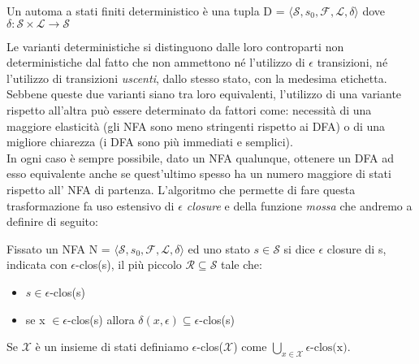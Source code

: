 \begin{definition}
    Un automa a stati finiti deterministico è una tupla D = $\langle \mathcal{S}, s_0, \mathcal{F}, \mathcal{L}, \delta \rangle$ dove $\delta : \mathcal{S} \times \mathcal{L} \rightarrow \mathcal{S}$
\end{definition}
Le varianti deterministiche si distinguono dalle loro controparti non deterministiche dal fatto che non ammettono né l'utilizzo di $\epsilon$ transizioni, né l'utilizzo di transizioni \emph{uscenti}, dallo stesso stato, con la medesima etichetta. Sebbene queste due varianti siano tra loro equivalenti, l'utilizzo di una variante rispetto all'altra può essere determinato da fattori come: necessità di una maggiore elasticità (gli NFA sono meno stringenti rispetto ai DFA) o di una migliore chiarezza (i DFA sono più immediati e semplici).\\
In ogni caso è sempre possibile, dato un NFA qualunque, ottenere un DFA ad esso equivalente anche se quest'ultimo spesso ha un numero maggiore di stati rispetto all' NFA di partenza. L'algoritmo che permette di fare questa trasformazione fa uso estensivo di \emph{$\epsilon$ closure}\cite{Linguaggi_di_Prorgammazione} e della funzione \emph{mossa}\cite{Linguaggi_di_Prorgammazione} che andremo a definire di seguito:

\begin{definition}
    Fissato un NFA N = $\langle \mathcal{S}, s_0, \mathcal{F}, \mathcal{L}, \delta \rangle$ ed uno stato $s \in \mathcal{S}$ si dice $\epsilon$ closure di s, indicata con $\epsilon$-clos(s), il più piccolo $\mathcal{R} \subseteq \mathcal{S}$ tale che:
    \begin{itemize}
        \item $s \in \epsilon$-clos(s)
        \item se x $\in \epsilon$-clos(s) allora $\delta(x, \epsilon) \subseteq \epsilon$-clos(s)
    \end{itemize}
\end{definition}

\begin{remark}
    Se $\mathcal{X}$ è un insieme di stati definiamo $\epsilon$-clos($\mathcal{X}$) come $\bigcup_{x \in \mathcal{X}} \epsilon \mbox{-clos(x)}$.
\end{remark}

